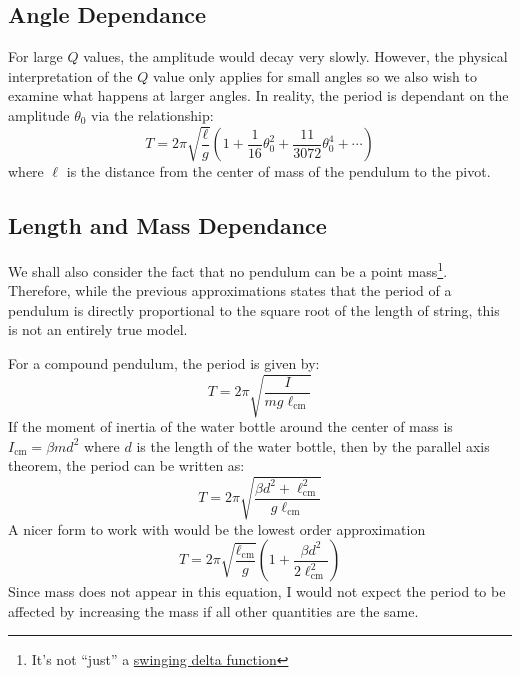 \documentclass[%
 reprint,
 amsmath,amssymb
 aps,
]{revtex4-2}
\begin{document}
\subsection{Angle Dependance}
For large $Q$ values, the amplitude would decay very slowly. However, the physical interpretation of the $Q$ value only applies for small angles so we also wish to examine what happens at larger angles. In reality, the period is dependant on the amplitude $\theta_0$ via the relationship:\cite{doi:10.1119/1.1457310} %
\begin{equation}
    T = 2\pi\sqrt{\frac{\ell}{g}}\left(1+\frac{1}{16}\theta_0^2+\frac{11}{3072}\theta_0^4+\cdots\right)
    \label{eq:correct-model}
\end{equation}
where $\ell$ is the distance from the center of mass of the pendulum to the pivot.

\subsection{Length and Mass Dependance}
We shall also consider the fact that no pendulum can be a point mass\footnote{It's not ``just'' a \href{https://youtu.be/kmgwYrwJ3M8?t=129}{swinging delta function}}. Therefore, while the previous approximations states that the period of a pendulum is directly proportional to the square root of the length of string, this is not an entirely true model.

For a compound pendulum, the period is given by:
\begin{equation}
    T = 2\pi\sqrt{\frac{I}{mg\ell_\text{cm}}}
    \label{eq:}
\end{equation}
If the moment of inertia of the water bottle around the center of mass is $I_\text{cm}=\beta m d^2$ where $d$ is the length of the water bottle, then by the parallel axis theorem, the period can be written as:
\begin{equation}
    T = 2\pi\sqrt{\frac{\beta d^2 + \ell_\text{cm}^2}{g\ell_\text{cm}}}
    \label{eq:proper}
\end{equation}
A nicer form to work with would be the lowest order approximation
\begin{equation}
    T = 2\pi\sqrt{\frac{\ell_\text{cm}}{g}}\left(1+\frac{\beta d^2}{2\ell_\text{cm}^2}\right)
    \label{eq:low order}
\end{equation}
Since mass does not appear in this equation, I would not expect the period to be affected by increasing the mass if all other quantities are the same.
\end{document}
